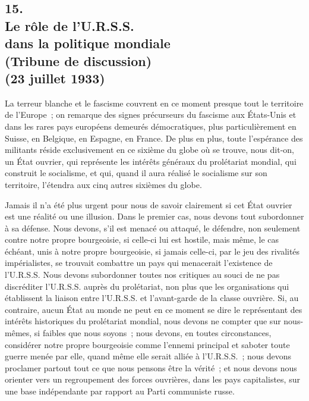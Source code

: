 \documentclass[french,twoside]{book} %
\begin{document}
\subsection[{15. Le rôle de l’U.R.S.S. dans la politique mondiale, (Tribune de discussion) (23 juillet 1933)}]{15. \\
Le rôle de l’U.R.S.S. \\
dans la politique mondiale \\
(Tribune de discussion) \\
(23 juillet 1933)}
\noindent \par
La terreur blanche et le fascisme couvrent en ce moment presque tout le territoire de l'Europe ; on remarque des signes précurseurs du fascisme aux États-Unis et dans les rares pays européens demeurés démocratiques, plus particulièrement en Suisse, en Belgique, en Espagne, en France. De plus en plus, toute l'espérance des militants réside exclusivement en ce sixième du globe où se trouve, nous dit-on, un État ouvrier, qui représente les intérêts généraux du prolétariat mondial, qui construit le socialisme, et qui, quand il aura réalisé le socialisme sur son territoire, l'étendra aux cinq autres sixièmes du globe.\par
Jamais il n'a été plus urgent pour nous de savoir clairement si cet État ouvrier est une réalité ou une illusion. Dans le premier cas, nous devons tout subordonner à sa défense. Nous devons, s'il est menacé ou attaqué, le défen­dre, non seulement contre notre propre bourgeoisie, si celle-ci lui est hostile, mais même, le cas échéant, unis à notre propre bourgeoisie, si jamais celle-ci, par le jeu des rivalités impérialistes, se trouvait combattre un pays qui mena­cerait l'existence de l'U.R.S.S. Nous devons subordonner toutes nos critiques au souci de ne pas discréditer l'U.R.S.S. auprès du prolétariat, non plus que les organisations qui établissent la liaison entre l'U.R.S.S. et l'avant-garde de la classe ouvrière. Si, au contraire, aucun État au monde ne peut en ce moment se dire le représentant des intérêts historiques du prolétariat mondial, nous devons ne compter que sur nous-mêmes, si faibles que nous soyons ; nous devons, en toutes circonstances, considérer notre propre bourgeoisie comme l'ennemi principal et saboter toute guerre menée par elle, quand même elle serait alliée à l'U.R.S.S. ; nous devons proclamer partout tout ce que nous pensons être la vérité ; et nous devons nous orienter vers un regroupement des forces ouvrières, dans les pays capitalistes, sur une base indépendante par rapport au Parti communiste russe.\par
\end{document}
